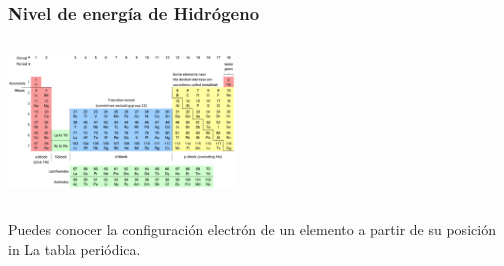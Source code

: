 \documentclass{beamer}
\begin{document}
\begin{frame}


\frametitle{Nivel de energía de Hidrógeno}
        \begin{columns}
            \begin{column}{0.5\textwidth}
                \includegraphics[width=6cm]{../../../../public/images/pTable.png}
                
            \end{column}

            \begin{column}{0.5\textwidth}
    
            \end{column}
        \end{columns}
    
        \vspace{1cm}

        \onslide Puedes conocer la configuración
        \pause \alert{electrón}
        \onslide de un elemento a partir de su
        \pause \alert{posición}
    \onslide in La tabla periódica. 
\end{frame}
\end{document}
